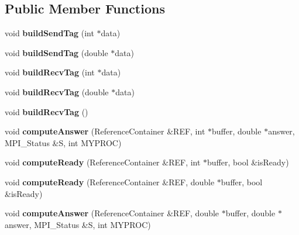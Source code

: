 \subsection*{Public Member Functions}
\begin{DoxyCompactItemize}
\item 
\mbox{\label{classFieldRequestObject_a8522242a8ba5892063c3e74350c8ada1}} 
void {\bfseries build\+Send\+Tag} (int $\ast$data)
\item 
\mbox{\label{classFieldRequestObject_a62b6f677a3c63324d17983c3db9cd45e}} 
void {\bfseries build\+Send\+Tag} (double $\ast$data)
\item 
\mbox{\label{classFieldRequestObject_a887b9bd282d07f20833d38116c162f03}} 
void {\bfseries build\+Recv\+Tag} (int $\ast$data)
\item 
\mbox{\label{classFieldRequestObject_ae13ca2b4dc1426f300a4b9bc463d7a33}} 
void {\bfseries build\+Recv\+Tag} (double $\ast$data)
\item 
\mbox{\label{classFieldRequestObject_acb9923d7cdfe59d99f0172e29387a0ed}} 
void {\bfseries build\+Recv\+Tag} ()
\item 
\mbox{\label{classFieldRequestObject_afda006103a3b1c5766c7b87f72193097}} 
void {\bfseries compute\+Answer} (Reference\+Container \&R\+EF, int $\ast$buffer, double $\ast$answer, M\+P\+I\+\_\+\+Status \&S, int M\+Y\+P\+R\+OC)
\item 
\mbox{\label{classFieldRequestObject_a5767264fc2688f83215023e3b7131f91}} 
void {\bfseries compute\+Ready} (Reference\+Container \&R\+EF, int $\ast$buffer, bool \&is\+Ready)
\item 
\mbox{\label{classFieldRequestObject_a1df3f4397288d977a288514dd88d50d5}} 
void {\bfseries compute\+Ready} (Reference\+Container \&R\+EF, double $\ast$buffer, bool \&is\+Ready)
\item 
\mbox{\label{classFieldRequestObject_a11965c293f75bf51635a69a3588739c2}} 
void {\bfseries compute\+Answer} (Reference\+Container \&R\+EF, double $\ast$buffer, double $\ast$answer, M\+P\+I\+\_\+\+Status \&S, int M\+Y\+P\+R\+OC)
\end{DoxyCompactItemize}
